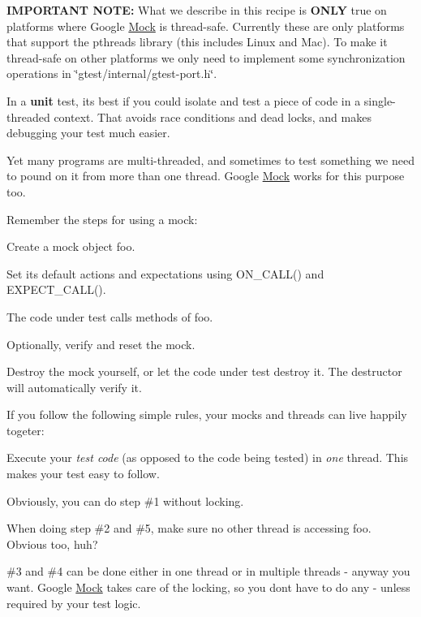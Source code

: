 {\bfseries I\+M\+P\+O\+R\+T\+A\+NT N\+O\+TE\+:} What we describe in this recipe is {\bfseries O\+N\+LY} true on platforms where Google \hyperlink{class_mock}{Mock} is thread-\/safe. Currently these are only platforms that support the pthreads library (this includes Linux and Mac). To make it thread-\/safe on other platforms we only need to implement some synchronization operations in {\ttfamily \char`\"{}gtest/internal/gtest-\/port.\+h\char`\"{}}.

In a {\bfseries unit} test, it\textquotesingle{}s best if you could isolate and test a piece of code in a single-\/threaded context. That avoids race conditions and dead locks, and makes debugging your test much easier.

Yet many programs are multi-\/threaded, and sometimes to test something we need to pound on it from more than one thread. Google \hyperlink{class_mock}{Mock} works for this purpose too.

Remember the steps for using a mock\+:


\begin{DoxyEnumerate}
\item Create a mock object {\ttfamily foo}.
\end{DoxyEnumerate}
\begin{DoxyEnumerate}
\item Set its default actions and expectations using {\ttfamily O\+N\+\_\+\+C\+A\+L\+L()} and {\ttfamily E\+X\+P\+E\+C\+T\+\_\+\+C\+A\+L\+L()}.
\end{DoxyEnumerate}
\begin{DoxyEnumerate}
\item The code under test calls methods of {\ttfamily foo}.
\end{DoxyEnumerate}
\begin{DoxyEnumerate}
\item Optionally, verify and reset the mock.
\end{DoxyEnumerate}
\begin{DoxyEnumerate}
\item Destroy the mock yourself, or let the code under test destroy it. The destructor will automatically verify it.
\end{DoxyEnumerate}

If you follow the following simple rules, your mocks and threads can live happily togeter\+:


\begin{DoxyItemize}
\item Execute your {\itshape test code} (as opposed to the code being tested) in {\itshape one} thread. This makes your test easy to follow.
\item Obviously, you can do step \#1 without locking.
\item When doing step \#2 and \#5, make sure no other thread is accessing {\ttfamily foo}. Obvious too, huh?
\item \#3 and \#4 can be done either in one thread or in multiple threads -\/ anyway you want. Google \hyperlink{class_mock}{Mock} takes care of the locking, so you don\textquotesingle{}t have to do any -\/ unless required by your test logic.
\end{DoxyItemize}

